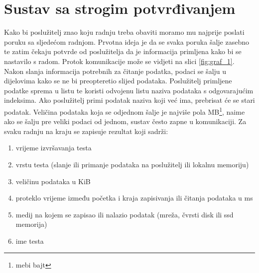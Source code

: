 \documentclass[times, utf8, zavrsni, square]{fer}
\begin{document}
\FloatBarrier
\section{Sustav sa strogim potvrđivanjem}

Kako bi poslužitelj znao koju radnju treba obaviti moramo mu najprije poslati poruku sa sljedećom radnjom. 
Prvotna ideja je da se svaka poruka šalje zasebno te zatim čekaju potvrde od poslužitelja da je informacija primljena kako bi se nastavilo s radom.
Protok komunikacije može se vidjeti na slici \ref{fig:graf_1}.
Nakon slanja informacija potrebnih za čitanje podatka, podaci se šalju u dijelovima kako se ne bi preopteretio slijed podataka.
Poslužitelj primljene podatke sprema u listu te koristi odvojenu listu naziva podataka s odgovarajućim indeksima.
Ako poslužitelj primi podatak naziva koji već ima, prebrisat će se stari podatak.
Veličina podataka koja se odjednom šalje je najviše pola MB\footnote{mebi bajt}, naime ako se šalju pre veliki podaci od jednom, sustav često zapne u komunikaciji.
Za svaku radnju na kraju se zapisuje rezultat koji sadrži:

    \begin{enumerate}
    \itemsep0em
    \item vrijeme izvršavanja testa
    \item vrstu testa (slanje ili primanje podataka na poslužitelj ili lokalnu memoriju)
    \item veličinu podataka u KiB
    \item proteklo vrijeme između početka i kraja zapisivanja ili čitanja podataka u ms
    \item medij na kojem se zapisao ili nalazio podatak (mreža, čvrsti disk ili ssd memorija)
    \item ime testa
    \end{enumerate}
\end{document}
